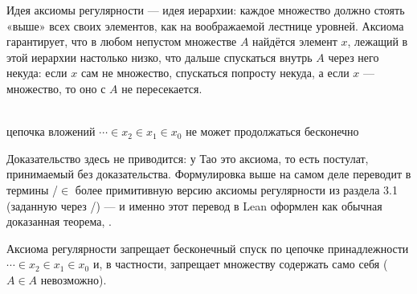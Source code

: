 \begin{intuition}
Идея аксиомы регулярности — идея иерархии: каждое множество должно стоять «выше» всех своих
элементов, как на воображаемой лестнице уровней. Аксиома гарантирует, что в любом непустом
множестве $A$ найдётся элемент $x$, лежащий в этой иерархии настолько низко, что дальше
спускаться внутрь $A$ через него некуда: если $x$ сам не множество, спускаться попросту
некуда, а если $x$ — множество, то оно с $A$ не пересекается.

\begin{center}
\\
{\footnotesize\color{intuitiongray}цепочка вложений $\cdots \in x_2 \in x_1 \in x_0$ не может
продолжаться бесконечно}
\end{center}
\end{intuition}

\begin{remark}
Доказательство здесь не приводится: у Тао это аксиома, то есть постулат, принимаемый без
доказательства. Формулировка выше на самом деле переводит в термины /$\in$ более
примитивную версию аксиомы регулярности из раздела 3.1 (заданную через
/) — и именно этот перевод в Lean оформлен как обычная доказанная
теорема, .
\end{remark}

\begin{remark}
Аксиома регулярности запрещает бесконечный спуск по цепочке принадлежности
$\cdots \in x_2 \in x_1 \in x_0$ и, в частности, запрещает множеству содержать само себя
($A \in A$ невозможно).
\end{remark}

